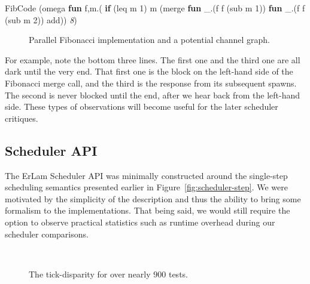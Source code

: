 \begin{SaveVerbatim}[commandchars=\\\{\}]{FibCode}
(omega \textbf{fun} f,m.(
    \textbf{if} (leq m 1) 
       m
       (merge \textbf{fun} _.(f f (sub m 1))
              \textbf{fun} _.(f f (sub m 2))
              add)) \textit{8})
\end{SaveVerbatim}
\begin{figure}[h!]

%
    \caption{Parallel Fibonacci implementation and a potential channel graph.}
    \label{fig:fibonacci-channel-demo}
\end{figure}

For example, note the bottom three lines. The first one and the third one are 
all dark until the very end. That first one is the block on the left-hand side
of the Fibonacci merge call, and the third is the response from its subsequent
spawns. The second is never blocked until the end, after we hear back from the
left-hand side. These types of observations will become useful for the later 
scheduler critiques.

\subsection{Scheduler API}\label{sec:results-evaluation-classical}

The ErLam Scheduler API was minimally constructed around the single-step 
scheduling semantics presented earlier in Figure~\ref{fig:scheduler-step}.
We were motivated by the simplicity of the description and thus the ability
to bring some formalism to the implementations. That being said, we would still
require the option to observe practical statistics such as runtime overhead 
during our scheduler comparisons. 

\begin{figure}[h!]
    ~
    \caption{The tick-disparity for over nearly $900$ tests.}
\end{figure}

